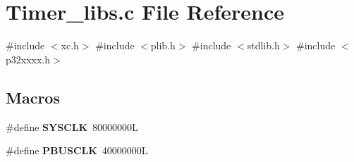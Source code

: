 \section{Timer\+\_\+libs.\+c File Reference}
\label{_timer__libs_8c}
{\ttfamily \#include $<$xc.\+h$>$}\newline
{\ttfamily \#include $<$plib.\+h$>$}\newline
{\ttfamily \#include $<$stdlib.\+h$>$}\newline
{\ttfamily \#include $<$p32xxxx.\+h$>$}\newline
\subsection*{Macros}
\begin{DoxyCompactItemize}
\item 
\#define \textbf{ S\+Y\+S\+C\+LK}~80000000L
\item 
\#define \textbf{ P\+B\+U\+S\+C\+LK}~40000000L
\end{DoxyCompactItemize}
